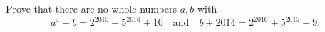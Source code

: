 Prove that there are no whole numbers $a,b$ with
\[a^4+b=2^{2015}+5^{2016}+10\quad\text{and}\quad b+2014=2^{2016}+5^{2015}+9.\]
